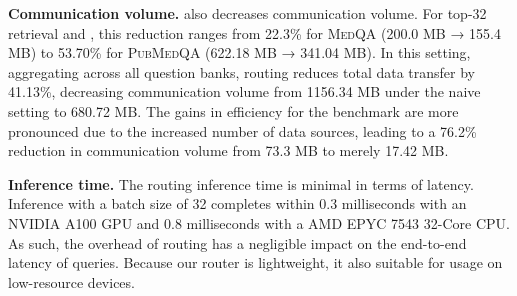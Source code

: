 \textbf{Communication volume.}
\sys also decreases communication volume.
For top-32 retrieval and \mirage, this reduction ranges from 22.3\% for \textsc{MedQA} (200.0 MB → 155.4 MB) to 53.70\% for \textsc{PubMedQA} (622.18 MB → 341.04 MB).
In this setting, aggregating across all question banks, routing reduces total data transfer by 41.13\%, decreasing communication volume from 1156.34 MB under the naive setting to 680.72 MB. The gains in efficiency for the \mmlu benchmark are more pronounced due to the increased number of data sources, leading to a 76.2\% reduction in communication volume from 73.3 MB to merely 17.42 MB. 

\textbf{Inference time.}
The routing inference time is minimal in terms of latency.
Inference with a batch size of 32 completes within 0.3 milliseconds with an NVIDIA A100 GPU and 0.8 milliseconds with a AMD EPYC 7543 32-Core CPU.
As such, the overhead of routing has a negligible impact on the end-to-end latency of queries.
Because our router is lightweight, it also suitable for usage on low-resource devices.



\begin{table}[t]
\centering
{}
\caption{Mean and standard deviation of end-to-end \ac{RAG} accuracy for configurations with the \mirage benchmark.}
\label{tab:medcpt_avg}
\vspace{-0.6cm}
\end{table}

